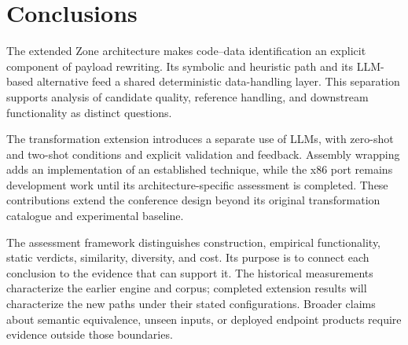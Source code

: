 \section{Conclusions}\label{sec:conclusions}
The extended Zone architecture makes code--data identification an
explicit component of payload rewriting. Its symbolic and heuristic
path and its LLM-based alternative feed a shared deterministic
data-handling layer. This separation supports analysis of candidate
quality, reference handling, and downstream functionality as distinct
questions.

The transformation extension introduces a separate use of LLMs,
with zero-shot and two-shot conditions and explicit validation and
feedback. Assembly wrapping adds an implementation of an established
technique, while the x86 port remains development work until its
architecture-specific assessment is completed. These contributions
extend the conference design beyond its original transformation
catalogue and experimental baseline.

The assessment framework distinguishes construction, empirical
functionality, static verdicts, similarity, diversity, and cost.
Its purpose is to connect each conclusion to the evidence that can
support it. The historical measurements characterize the earlier
engine and corpus; completed extension results will characterize
the new paths under their stated configurations. Broader claims
about semantic equivalence, unseen inputs, or deployed endpoint
products require evidence outside those boundaries.
